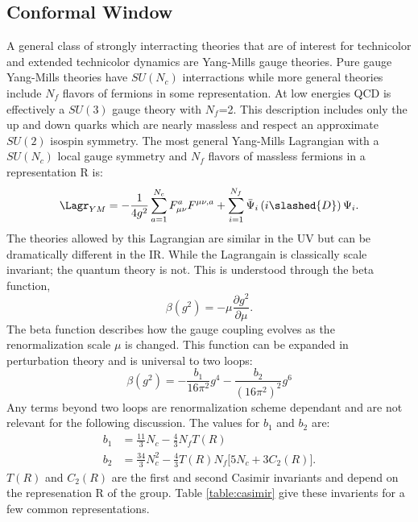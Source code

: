 \subsection{Conformal Window}
A general class of strongly interracting theories that are of interest for technicolor and extended technicolor dynamics are Yang-Mills gauge theories.
Pure gauge Yang-Mills theories have $SU(N_c)$ interractions while more general theories include $N_f$ flavors of fermions in some representation.
At low energies QCD is effectively a $SU(3)$ gauge theory with $N_f$=2.
This description includes only the up and down quarks which are nearly massless and respect an approximate $SU(2)$ isospin symmetry.
The most general Yang-Mills Lagrangian with a $SU(N_c)$ local gauge symmetry and $N_f$ flavors of massless fermions in a representation R is:
\begin{equation}
  \Lagr_{YM}=-\frac{1}{4g^2}\sum\limits_{a=1}^{N_c} F^a_{\mu\nu}F^{\mu\nu,a}+\sum\limits_{i=1}^{N_f} \bar\Psi_i\left(i\slashed{D}\right)\Psi_i.  
\end{equation}
The theories allowed by this Lagrangian are similar in the UV but can be dramatically different in the IR.
While the Lagrangain is classically scale invariant; the quantum theory is not.
This is understood through the beta function,
\begin{equation}
  \beta (g^2)=-\mu\frac{\partial g^2}{\partial \mu}.
\end{equation}
The beta function describes how the gauge coupling evolves as the renormalization scale $\mu$ is changed.
This function can be expanded in perturbation theory and is universal to two loops:
\begin{equation}
  \beta\left(g^2\right)=-\frac{b_1}{16\pi^2}g^4-\frac{b_2}{(16\pi^2)^2}g^6
\end{equation}
Any terms beyond two loops are renormalization scheme dependant and are not relevant for the following discussion.
The values for $b_1$ and $b_2$ are:
\begin{align}
  b_1&=\frac{11}{3}N_c-\frac{4}{3}N_fT(R)\\
  b_2&=\frac{34}{3}N_c^2-\frac{4}{3}T(R)N_f\Big[5N_c+3C_2(R)\Big].
\end{align}
$T(R)$ and $C_2(R)$ are the first and second Casimir invariants and depend on the represenation R of the group.
Table \ref{table:casimir} give these invarients for a few common representations.

